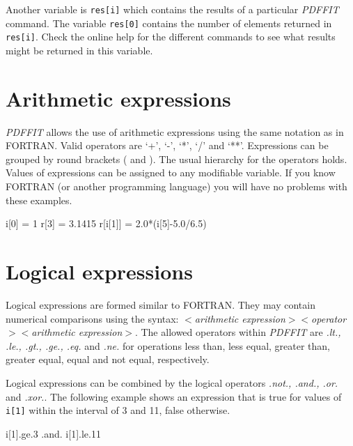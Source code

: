 Another variable is {\tt res[i]} which contains the results of a
particular {\it PDFFIT} command. The variable {\tt res[0]} contains
the number of elements returned in {\tt res[i]}. Check the online
help for the different commands to see what results might be
returned in this variable. \par


\section{Arithmetic expressions \label{arith-exp}}

{\it PDFFIT} allows the use of arithmetic expressions using the same
notation as in FORTRAN. Valid operators are `+', `-', `*', `/' and `**'.
Expressions can be grouped by round brackets ( and ). The usual
hierarchy for the operators holds. Values of expressions can be
assigned to any modifiable variable. If you know FORTRAN (or another
programming language) you will have no problems with these examples.

\begin{MacVerbatim}
  i[0] = 1
  r[3] = 3.1415
  r[i[1]] = 2.0*(i[5]-5.0/6.5)
\end{MacVerbatim}


\section{Logical expressions \label{log-exp}}

Logical expressions are formed similar to FORTRAN.  They may contain
numerical comparisons using the syntax: {\it $<$arithmetic
expression$> <$operator$> <$arithmetic expression$>$}.  The allowed
operators within {\it PDFFIT} are {\it .lt., .le., .gt., .ge., .eq.}
and {\it .ne.} for operations less than, less equal, greater than,
greater equal, equal and not equal, respectively.\par

Logical expressions can be combined by the logical operators {\it
.not., .and., .or.} and {\it .xor.}.  The following example shows an
expression that is true for values of {\tt i[1]} within the interval
of 3 and 11, false otherwise.

\begin{MacVerbatim}
  i[1].ge.3 .and. i[1].le.11
\end{MacVerbatim}

